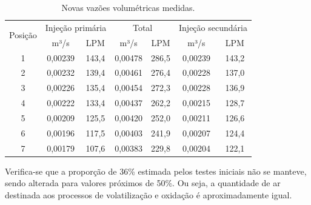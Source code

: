 \begin{table}[!htbp]
	\centering
	\small
	\renewcommand{\arraystretch}{1.3}
	\caption{Novas vazões volumétricas medidas.}%
	\label{tab:vazoesnova}
        \begin{tabular}{|c|cc|cc|cc|}
        \hline
        \multirow{2}{*}{Posição} & \multicolumn{2}{c|}{Injeção primária} & \multicolumn{2}{c|}{Total}           & \multicolumn{2}{c|}{Injeção secundária} \\ \cline{2-7} 
                                 & \multicolumn{1}{c|}{m³/s}     & LPM   & \multicolumn{1}{c|}{m³/s}    & LPM   & \multicolumn{1}{c|}{m³/s}      & LPM    \\ \hline
        1                        & \multicolumn{1}{c|}{0,00239}  & 143,4 & \multicolumn{1}{c|}{0,00478} & 286,5 & \multicolumn{1}{c|}{0,00239}   & 143,2  \\ \hline
        2                        & \multicolumn{1}{c|}{0,00232}  & 139,4 & \multicolumn{1}{c|}{0,00461} & 276,4 & \multicolumn{1}{c|}{0,00228}   & 137,0  \\ \hline
        3                        & \multicolumn{1}{c|}{0,00226}  & 135,4 & \multicolumn{1}{c|}{0,00454} & 272,3 & \multicolumn{1}{c|}{0,00228}   & 136,9  \\ \hline
        4                        & \multicolumn{1}{c|}{0,00222}  & 133,4 & \multicolumn{1}{c|}{0,00437} & 262,2 & \multicolumn{1}{c|}{0,00215}   & 128,7  \\ \hline
        5                        & \multicolumn{1}{c|}{0,00209}  & 125,5 & \multicolumn{1}{c|}{0,00420} & 252,0 & \multicolumn{1}{c|}{0,00211}   & 126,6  \\ \hline
        6                        & \multicolumn{1}{c|}{0,00196}  & 117,5 & \multicolumn{1}{c|}{0,00403} & 241,9 & \multicolumn{1}{c|}{0,00207}   & 124,4  \\ \hline
        7                        & \multicolumn{1}{c|}{0,00179}  & 107,6 & \multicolumn{1}{c|}{0,00383} & 229,8 & \multicolumn{1}{c|}{0,00204}   & 122,1  \\ \hline
        \end{tabular}
	\vspace{2mm}
\end{table}

Verifica-se que a proporção de 36\% estimada pelos testes iniciais não se manteve, sendo alterada para valores próximos de 50\%. Ou seja, a quantidade de ar destinada aos processos de volatilização e oxidação é aproximadamente igual.


